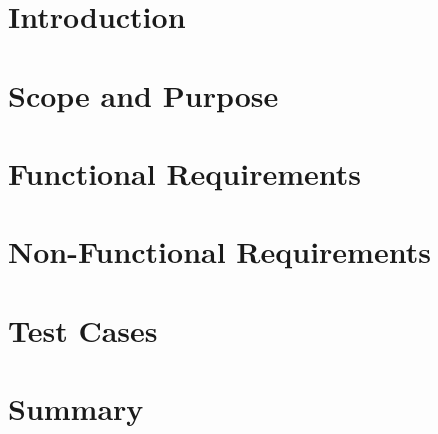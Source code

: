 \documentclass[12pt]{IEEEtran}
\begin{document}
\section{Introduction}
\label{sec:}

\section{Scope and Purpose}
\label{sec:scope}

\section{Functional Requirements}
\label{sec:funcReq}

\section{Non-Functional Requirements}
\label{sec:nonFuncReq}

\section{Test Cases}
\label{sec:test}

\section{Summary}
\label{sec:summary}
\end{document}

